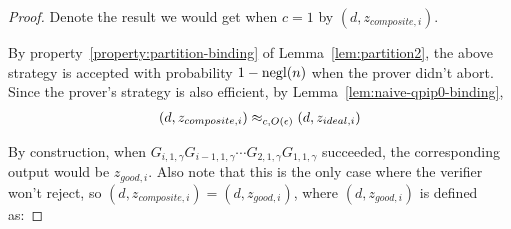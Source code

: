 \begin{proof}



Denote the result we would get when $c=1$ by $(d,z_{composite,i})$.

By  property~\ref{property:partition-binding} of Lemma~\ref{lem:partition2}, the above strategy is accepted with probability $1-\operatorname{negl}(n)$ when the prover didn't abort. Since the prover's strategy is also efficient, by Lemma~\ref{lem:naive-qpip0-binding},
\begin{align}
    (d,z_{composite,i})\approx_{c, O(\epsilon)}(d,z_{ideal,i})
\end{align}



By construction, when $G_{i,1,\gamma}G_{i-1,1,\gamma} \cdots G_{2,1,\gamma}G_{1,1,\gamma}$ succeeded, the corresponding output would be $z_{good,i}$. Also note that this is the only case where the verifier won't reject, so $(d,z_{composite,i})=(d,z_{good,i})$, where $(d,z_{good,i})$ is defined as:


\end{proof}
